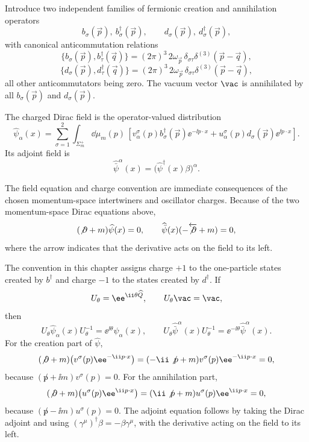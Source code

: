 \begin{definition}
\label{def:free-charged-dirac-field-car}
Introduce two independent families of fermionic creation and annihilation
operators
\[
  b_\sigma(\vec p),\ b_\sigma^\dagger(\vec p),
  \qquad
  d_\sigma(\vec p),\ d_\sigma^\dagger(\vec p),
\]
with canonical anticommutation relations
\[
  \{b_\sigma(\vec p),b_\tau^\dagger(\vec q)\}
  =
  (2\pi)^3\,2\omega_{\vec p}\,
  \delta_{\sigma\tau}\delta^{(3)}(\vec p-\vec q),
\]
\[
  \{d_\sigma(\vec p),d_\tau^\dagger(\vec q)\}
  =
  (2\pi)^3\,2\omega_{\vec p}\,
  \delta_{\sigma\tau}\delta^{(3)}(\vec p-\vec q),
\]
all other anticommutators being zero. The vacuum vector \(\vac\) is
annihilated by all \(b_\sigma(\vec p)\) and \(d_\sigma(\vec p)\).

The charged Dirac field is the operator-valued distribution
\[
  \widehat\psi_\alpha(x)
  =
  \sum_{\sigma=1}^2
  \int_{\Sigma_m^+}\dd\mu_m(p)\,
  \left[
    v_\alpha^\sigma(p)b_\sigma^\dagger(\vec p)\ee^{-\ii p\cdot x}
    +
    u_\alpha^\sigma(p)d_\sigma(\vec p)\ee^{\ii p\cdot x}
  \right].
\]
Its adjoint field is
\[
  \widehat{\bar\psi}^{\alpha}(x)
  =
  \bigl(\widehat\psi^\dagger(x)\beta\bigr)^\alpha .
\]
\end{definition}

The field equation and charge convention are immediate consequences of the
chosen momentum-space intertwiners and oscillator charges.  Because of the two
momentum-space Dirac equations above,
\[
  (\not\partial+m)\widehat\psi(x)=0,
  \qquad
  \widehat{\bar\psi}(x)(-\overleftarrow{\not\partial}+m)=0,
\]
where the arrow indicates that the derivative acts on the field to its left.

The convention in this chapter assigns charge \(+1\) to the one-particle
states created by \(b^\dagger\) and charge \(-1\) to the states created by
\(d^\dagger\). If
\[
  U_\theta=\ee^{\ii\theta \widehat Q},
  \qquad
  U_\theta\vac=\vac ,
\]
then
\[
  U_\theta\widehat\psi_\alpha(x)U_\theta^{-1}
  =
  \ee^{\ii\theta}\widehat\psi_\alpha(x),
  \qquad
  U_\theta\widehat{\bar\psi}^{\alpha}(x)U_\theta^{-1}
  =
  \ee^{-\ii\theta}\widehat{\bar\psi}^{\alpha}(x).
\]
For the creation part of \(\widehat\psi\),
\[
  (\not\partial+m)\bigl(v^\sigma(p)\ee^{-\ii p\cdot x}\bigr)
  =
  (-\ii\not p+m)v^\sigma(p)\ee^{-\ii p\cdot x}
  =
  0,
\]
because \((\not p+\ii m)v^\sigma(p)=0\).  For the annihilation part,
\[
  (\not\partial+m)\bigl(u^\sigma(p)\ee^{\ii p\cdot x}\bigr)
  =
  (\ii\not p+m)u^\sigma(p)\ee^{\ii p\cdot x}
  =
  0,
\]
because \((\not p-\ii m)u^\sigma(p)=0\).  The adjoint equation follows by
taking the Dirac adjoint and using
\((\gamma^\mu)^\dagger\beta=-\beta\gamma^\mu\), with the derivative acting on
the field to its left.

